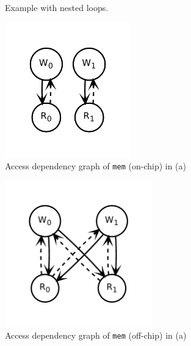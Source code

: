 \begin{figure}
\centering
\begin{subfigure}[b]{0.34\textwidth}
\inputminted{python}{code/dep1.py}
\caption {
  Example with nested loops.
}
\end{subfigure}
\hfill
\begin{subfigure}[b]{0.3\textwidth}
  \centering
\includegraphics[width=0.6\textwidth]{figs/dep1.pdf}
\caption{
  Access dependency graph of \texttt{mem} (on-chip) in (a)
}
\end{subfigure}
\hfill
\begin{subfigure}[b]{0.3\textwidth}
  \centering
\includegraphics[width=0.7\textwidth]{figs/dep2.pdf}
\caption{
  Access dependency graph of \texttt{mem} (off-chip) in (a)
}
\end{subfigure}
\\
\begin{subfigure}[b]{0.4\textwidth}

\end{subfigure}
\end{figure}
